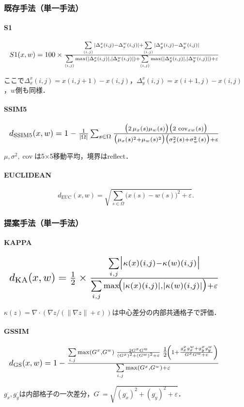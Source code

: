 \documentclass{jarticle}
\theoremstyle{definition}
\newcommand{\halfeq}[2][0.85\linewidth]{%
  \begin{equation}
    \makebox[\linewidth][l]{\resizebox{#1}{!}{\ensuremath{#2}}}%
  \end{equation}
}
\begin{document}
\subsubsection*{既存手法（単一手法）}
\paragraph{S1}
\halfeq[0.90\linewidth]{%
S1(x,w)=100\times
\frac{\sum\limits_{(i,j)}|\Delta_x^x(i,j)-\Delta_x^w(i,j)|+\sum\limits_{(i,j)}|\Delta_y^x(i,j)-\Delta_y^w(i,j)|}
{\sum\limits_{(i,j)}\max(|\Delta_x^x(i,j)|,|\Delta_x^w(i,j)|)+\sum\limits_{(i,j)}\max(|\Delta_y^x(i,j)|,|\Delta_y^w(i,j)|)+\varepsilon}%
}
ここで$\Delta_x^x(i,j)=x(i,j+1)-x(i,j)$，$\Delta_y^x(i,j)=x(i+1,j)-x(i,j)$，$w$側も同様．

\paragraph{SSIM5}
\halfeq[0.90\linewidth]{%
d_{\mathrm{SSIM5}}(x,w)=1-\frac{1}{|\Omega|}\sum_{s\in\Omega}
\frac{\bigl(2\,\mu_x(s)\mu_w(s)\bigr)\bigl(2\,\operatorname{cov}_{xw}(s)\bigr)}
{\bigl(\mu_x(s)^2+\mu_w(s)^2\bigr)\bigl(\sigma_x^2(s)+\sigma_w^2(s)\bigr)+\varepsilon}%
}
$\mu,\sigma^2,\operatorname{cov}$は5×5移動平均，境界はreflect．

\paragraph{EUCLIDEAN}
\begin{equation}
d_{\mathrm{EUC}}(x,w)=\sqrt{\sum_{s\in\Omega}\bigl(x(s)-w(s)\bigr)^2+\varepsilon}.
\end{equation}

\subsubsection*{提案手法（単一手法）}
\paragraph{KAPPA}
\halfeq[0.90\linewidth]{%
d_{\mathrm{KA}}(x,w)=\tfrac{1}{2}\times
\frac{\sum\limits_{i,j}\bigl|\kappa(x)(i,j)-\kappa(w)(i,j)\bigr|}
{\sum\limits_{i,j}\max\!\bigl(|\kappa(x)(i,j)|,|\kappa(w)(i,j)|\bigr)+\varepsilon}%
}
$\kappa(z)=\nabla\cdot\left(\nabla z/(\|\nabla z\|+\varepsilon)\right)$は中心差分の内部共通格子で評価．

\paragraph{GSSIM}
\halfeq[0.90\linewidth]{%
d_{\mathrm{GS}}(x,w)=1-
\frac{\sum\limits_{i,j} \max(G^x,G^w)\;
\frac{2G^xG^w}{(G^x)^2+(G^w)^2+\varepsilon}\;
\tfrac{1}{2}\!\left(1+\frac{g_x^x g_x^w+g_y^x g_y^w}{G^x G^w+\varepsilon}\right)
}{\sum\limits_{i,j}\max(G^x,G^w)+\varepsilon}%
}
$g_x^\cdot,g_y^\cdot$は内部格子の一次差分，$G^\cdot=\sqrt{(g_x^\cdot)^2+(g_y^\cdot)^2+\varepsilon}$．
\end{document}
